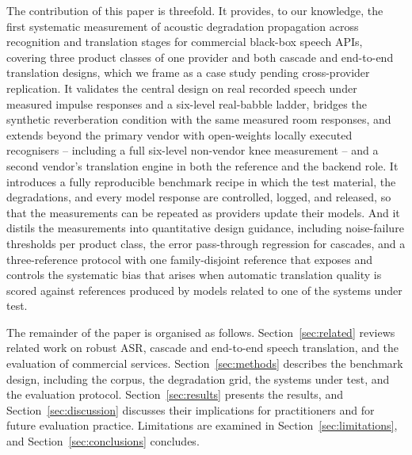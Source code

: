 The contribution of this paper is threefold. It provides, to our knowledge,
the first systematic measurement of acoustic degradation propagation across
recognition and translation stages for commercial black-box speech APIs,
covering three product classes of one provider and both cascade and
end-to-end translation designs, which we frame as a case study pending
cross-provider replication. It validates the central design on real recorded
speech under measured impulse responses and a six-level real-babble ladder,
bridges the synthetic reverberation condition with the same measured room
responses, and extends beyond the primary vendor with open-weights locally
executed recognisers -- including a full six-level non-vendor knee
measurement -- and a second vendor's translation engine in
both the reference and the backend role. It introduces a fully reproducible benchmark
recipe in which the test material, the degradations, and every model response
are controlled, logged, and released, so that the measurements can be
repeated as providers update their models. And it distils the measurements
into quantitative design guidance, including noise-failure thresholds per
product class, the error pass-through regression for cascades, and a
three-reference protocol with one family-disjoint reference that exposes
and controls the systematic bias that
arises when automatic translation quality is scored against references
produced by models related to one of the systems under test.

The remainder of the paper is organised as follows.
Section~\ref{sec:related} reviews related work on robust ASR, cascade and
end-to-end speech translation, and the evaluation of commercial services.
Section~\ref{sec:methods} describes the benchmark design, including the
corpus, the degradation grid, the systems under test, and the evaluation
protocol. Section~\ref{sec:results} presents the results, and
Section~\ref{sec:discussion} discusses their implications for practitioners
and for future evaluation practice. Limitations are examined in
Section~\ref{sec:limitations}, and Section~\ref{sec:conclusions} concludes.
